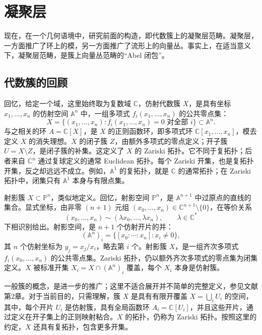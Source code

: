 \section{凝聚层}\label{sec:4.3}

现在，在一个几何语境中，研究前面的构造，即代数簇上的凝聚层范畴。凝聚层，一方面推广了环上的模，另一方面推广了流形上的向量丛。事实上，在适当意义下，凝聚层范畴，是簇上向量丛范畴的“Abel 闭包”。

\subsection{代数簇的回顾}\label{sec:4.3.1}

回忆，给定一个域，这里始终取为复数域 $\mathbb{C}$，仿射代数簇 $X$，是具有坐标 $x_1,\ldots,x_n$ 的仿射空间 $\mathbb{A}^n$ 中，一组多项式 $f_i(x_1,\ldots,x_n)$ 的公共零点集：
\[
X=\{(x_1,\ldots,x_n):f_i(x_1,\ldots,x_n)=0\text{ 对全部 }i\}
\subset\mathbb{A}^n.
\]
与之相关的环 $A=\mathbb{C}[X]$，是 $X$ 的正则函数环，即多项式环 $\mathbb{C}[x_1,\ldots,x_n]$，模去定义 $X$ 的消失理想。$X$ 的闭子簇 $Z$，由额外多项式的零点定义；开子簇 $U=X\setminus Z$，是闭子簇的补集。这定义了 $X$ 的 Zariski 拓扑。它不同于复拓扑；后者来自 $\mathbb{C}^n$ 通过复球定义的通常 Euclidean 拓扑。每个 Zariski 开集，也是复拓扑开集，反之却远远不成立。例如，$\mathbb{A}^1$ 的复拓扑，就是 $\mathbb{C}$ 的通常拓扑；在 Zariski 拓扑中，闭集只有 $\mathbb{A}^1$ 本身与有限点集。

射影簇 $X\subset\mathbb{P}^n$，类似地定义。回忆，射影空间 $\mathbb{P}^n$，是 $\mathbb{A}^{n+1}$ 中过原点的直线的集合。显式坐标，由非零 $(n+1)$ 元组 $(x_0,\ldots,x_n)\in\mathbb{C}^{n+1}\setminus\{0\}$，在等价关系
\[
(x_0,\ldots,x_n)\sim(\lambda x_0,\ldots,\lambda x_n),
\qquad\lambda\in\mathbb{C}^*
\]
下相识别给出。射影空间，是 $n+1$ 个仿射开片的并：
\[
(\mathbb{A}^n)_i=\{[x_0:\cdots:x_n]:x_i\ne0\},
\]
其 $n$ 个仿射坐标为 $y_j=x_j/x_i$，略去第 $i$ 个。射影簇 $X$，是一组齐次多项式 $f_i(x_0,\ldots,x_n)$ 的公共零点集。Zariski 拓扑，仍以额外齐次多项式的零点集为闭集定义。$X$ 被标准开集 $X_i=X\cap(\mathbb{A}^n)_i$ 覆盖，每个 $X_i$ 本身是仿射簇。

一般簇的概念，是进一步的推广；这里不适合展开并不简单的完整定义，参见文献第2章。对于当前目的，只需理解，簇 $X$ 是具有有限开覆盖 $X=\bigcup_iU_i$ 的空间，其中，每个开片 $U_i$ 是仿射簇，具有全局函数环 $A_i=\mathbb{C}[U_i]$，并且这些开片，通过定义在开子集上的正则映射粘合。$X$ 的拓扑，仍称为 Zariski 拓扑。按照这里的约定，$X$ 还具有复拓扑，包含更多开集。

